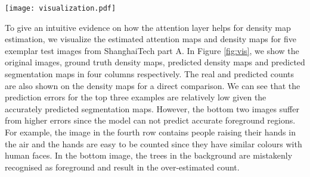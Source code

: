 \documentclass[journal,comsoc]{IEEEtran}
\begin{document}
\begin{table}[htbp]
     \centering
    {\caption[]{Results of different approaches to segmentation map supervision.}
    \label{table:exp_sga}
}
\end{table}


\begin{figure*}[t!]
    \centering
    \texttt{[image: visualization.pdf]}
    \caption{Visualization of estimated density and segmentation maps for five test images from ShanghaiTech part A. The numbers shown on the images in the second and third columns are the ground truth and estimated counts respectively.}
    \label{fig:vis}
\end{figure*}

To give an intuitive evidence on how the attention layer helps for density map estimation, we visualize the estimated attention maps and density maps for five exemplar test images from ShanghaiTech part A. In Figure \ref{fig:vis}, we show the original images, ground truth density maps, predicted density maps and predicted segmentation maps in four columns respectively. The real and predicted counts are also shown on the density maps for a direct comparison. We can see that the prediction errors for the top three examples are relatively low given the accurately predicted segmentation maps. However, the bottom two images suffer from higher errors since the model can not predict accurate foreground regions. For example, the image in the fourth row contains people raising their hands in the air and the hands are easy to be counted since they have similar colours with human faces. In the bottom image, the trees in the background are mistakenly recognised as foreground and result in the over-estimated count. 
\end{document}
